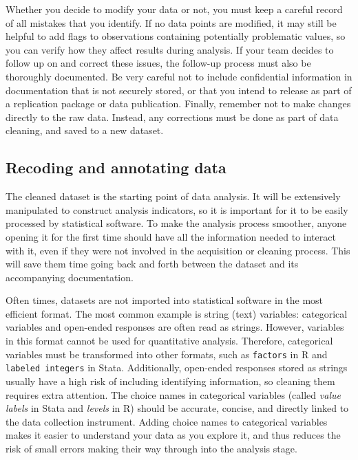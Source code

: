 Whether you decide to modify your data or not,
you must keep a careful record of all mistakes that you identify.
If no data points are modified, 
it may still be helpful to add flags to observations containing
potentially problematic values,
so you can verify how they affect results during analysis.
If your team decides to follow up on and correct these issues,
the follow-up process must also be thoroughly documented.
Be very careful not to include confidential information in documentation that is not securely stored,
or that you intend to release as part of a replication package or data publication.
Finally, remember not to make changes directly to the raw data.
Instead, any corrections must be done as part of data cleaning,
and saved to a new dataset.

\subsection{Recoding and annotating data}

The cleaned dataset is the starting point of data analysis.
It will be extensively manipulated to construct analysis indicators,
so it is important for it to be easily processed by statistical software.
To make the analysis process smoother, 
anyone opening it for the first time should have all the information needed to interact with it,
even if they were not involved in the acquisition or cleaning process.
This will save them time going back and forth between the dataset and its accompanying documentation. 

Often times, datasets are not imported into statistical software in the most efficient format.
The most common example is string (text) variables:
categorical variables and open-ended responses are often read as strings.
However, variables in this format cannot be used for quantitative analysis.
Therefore, categorical variables must be transformed into other formats,
such as \texttt{factors} in R and \texttt{labeled integers} in Stata.
Additionally, open-ended responses stored as strings usually have a high risk of including identifying information, 
so cleaning them requires extra attention.
The choice names in categorical variables
(called \textit{value labels} in Stata and \textit{levels} in R)
should be accurate, concise, 
and directly linked to the data collection instrument.
Adding choice names to categorical variables 
makes it easier to understand your data as you explore it,
and thus reduces the risk of small errors making their way through into the analysis stage.

